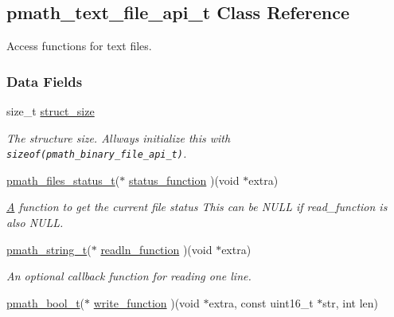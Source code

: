 \hypertarget{structpmath__text__file__api__t}{
\subsection{pmath\_\-text\_\-file\_\-api\_\-t Class Reference}
\label{structpmath__text__file__api__t}
}
Access functions for text files.  


\subsubsection*{Data Fields}
\begin{CompactItemize}
\item 
\hypertarget{structpmath__text__file__api__t_81f514ebd650b6f9fafa729b8f11f6c1}{
size\_\-t \hyperlink{structpmath__text__file__api__t_81f514ebd650b6f9fafa729b8f11f6c1}{struct\_\-size}}
\label{structpmath__text__file__api__t_81f514ebd650b6f9fafa729b8f11f6c1}

\begin{CompactList}\small\item\em The structure size. Allways initialize this with {\tt sizeof(pmath\_\-binary\_\-file\_\-api\_\-t)}. \item\end{CompactList}\item 
\hypertarget{structpmath__text__file__api__t_b653cb79f5d125547273d92c8732ae56}{
\hyperlink{group__file__api_g1fa07caf59a04495b7c74be6aff3a3d9}{pmath\_\-files\_\-status\_\-t}($\ast$ \hyperlink{structpmath__text__file__api__t_b653cb79f5d125547273d92c8732ae56}{status\_\-function} )(void $\ast$extra)}
\label{structpmath__text__file__api__t_b653cb79f5d125547273d92c8732ae56}

\begin{CompactList}\small\item\em \hyperlink{class_a}{A} function to get the current file status This can be NULL if read\_\-function is also NULL. \item\end{CompactList}\item 
\hypertarget{structpmath__text__file__api__t_abe46e2df9d80cd8cbdea420ca5f4542}{
\hyperlink{classpmath__string__t}{pmath\_\-string\_\-t}($\ast$ \hyperlink{structpmath__text__file__api__t_abe46e2df9d80cd8cbdea420ca5f4542}{readln\_\-function} )(void $\ast$extra)}
\label{structpmath__text__file__api__t_abe46e2df9d80cd8cbdea420ca5f4542}

\begin{CompactList}\small\item\em An optional callback function for reading one line. \item\end{CompactList}\item 
\hypertarget{structpmath__text__file__api__t_ce3f46ffa4c01b12baf1d4f981c6bcb9}{
\hyperlink{group__general__types_gc92090cb0b56345d6c379ed2341d4ef4}{pmath\_\-bool\_\-t}($\ast$ \hyperlink{structpmath__text__file__api__t_ce3f46ffa4c01b12baf1d4f981c6bcb9}{write\_\-function} )(void $\ast$extra, const uint16\_\-t $\ast$str, int len)}
\label{structpmath__text__file__api__t_ce3f46ffa4c01b12baf1d4f981c6bcb9}


\end{CompactItemize}
